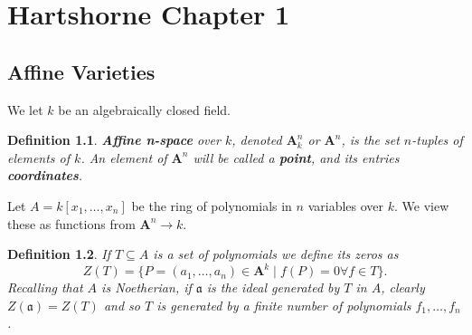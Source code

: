 \documentclass{report}
\providecommand{\A}{\textbf{A}}
\newtheorem{defi}{Definition}
\begin{document}
    
  \chapter{Hartshorne Chapter 1}
  \section{Affine Varieties}
  We let $k$ be an algebraically closed field.
  \begin{defi}
    \textbf{Affine n-space} over $k$, denoted $\textbf{A}^n_k$ or $\A^n$, is the set $n$-tuples of elements of $k$. An element of $\A^n$ will be called a \textbf{point}, and its entries \textbf{coordinates}.
  \end{defi}

  Let $A=k[x_1,\ldots, x_n]$ be the ring of polynomials in $n$ variables over $k$. We view these as functions from $\A^n\to k$.

  \begin{defi}
    If $T\subseteq A$ is a set of polynomials we define its zeros as
    \[
      Z(T) = \{P=(a_1,\ldots, a_n)\in \A^k\mid f(P)=0\forall f\in T\}.
    \]
    Recalling that $A$ is Noetherian, if $\mathfrak{a}$ is the ideal generated by $T$ in $A$, clearly $Z(\mathfrak{a})=Z(T)$ and so $T$ is generated by a finite number of polynomials $f_1,\ldots, f_n$. 
  \end{defi}
\end{document}
